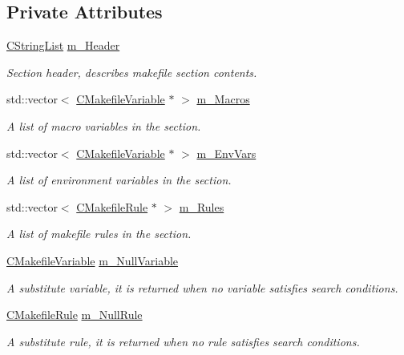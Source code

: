 \subsection*{Private Attributes}
\begin{DoxyCompactItemize}
\item 
\hyperlink{classCStringList}{C\-String\-List} \hyperlink{classCMakefileSection_a19aff76a974cefa540960369eaed43ec}{m\-\_\-\-Header}
\begin{DoxyCompactList}\small\item\em Section header, describes makefile section contents. \end{DoxyCompactList}\item 
std\-::vector$<$ \hyperlink{classCMakefileVariable}{C\-Makefile\-Variable} $\ast$ $>$ \hyperlink{classCMakefileSection_a77768b7c6c3acb031990ebcbae9957de}{m\-\_\-\-Macros}
\begin{DoxyCompactList}\small\item\em A list of macro variables in the section. \end{DoxyCompactList}\item 
std\-::vector$<$ \hyperlink{classCMakefileVariable}{C\-Makefile\-Variable} $\ast$ $>$ \hyperlink{classCMakefileSection_acd47bab1b30e88633d75c9fd08497fca}{m\-\_\-\-Env\-Vars}
\begin{DoxyCompactList}\small\item\em A list of environment variables in the section. \end{DoxyCompactList}\item 
std\-::vector$<$ \hyperlink{classCMakefileRule}{C\-Makefile\-Rule} $\ast$ $>$ \hyperlink{classCMakefileSection_aa5ba1d41937450d96795e4e08cb64f49}{m\-\_\-\-Rules}
\begin{DoxyCompactList}\small\item\em A list of makefile rules in the section. \end{DoxyCompactList}\item 
\hyperlink{classCMakefileVariable}{C\-Makefile\-Variable} \hyperlink{classCMakefileSection_ad9819eeb550fafffcfe7814ffd859cdd}{m\-\_\-\-Null\-Variable}
\begin{DoxyCompactList}\small\item\em A substitute variable, it is returned when no variable satisfies search conditions. \end{DoxyCompactList}\item 
\hyperlink{classCMakefileRule}{C\-Makefile\-Rule} \hyperlink{classCMakefileSection_a30793048110e7a747f5b142bec3143a7}{m\-\_\-\-Null\-Rule}
\begin{DoxyCompactList}\small\item\em A substitute rule, it is returned when no rule satisfies search conditions. \end{DoxyCompactList}\end{DoxyCompactItemize}


